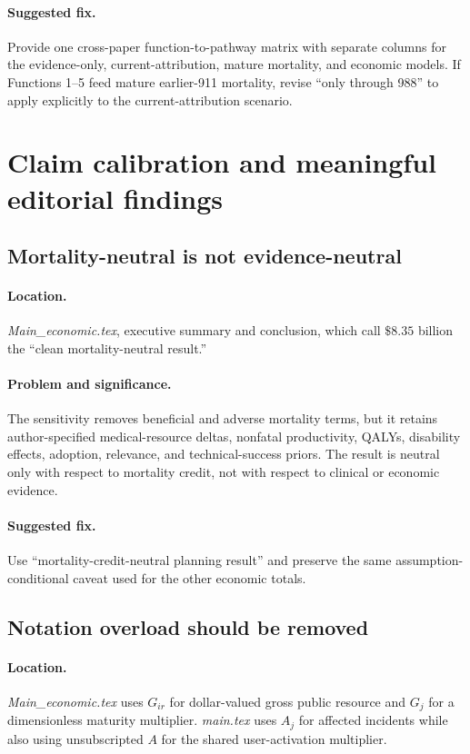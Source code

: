 \documentclass[11pt]{article}
\begin{document}
\paragraph{Suggested fix.}
Provide one cross-paper function-to-pathway matrix with separate columns for
the evidence-only, current-attribution, mature mortality, and economic models.
If Functions 1--5 feed mature earlier-911 mortality, revise ``only through
988'' to apply explicitly to the current-attribution scenario.

\section*{Claim calibration and meaningful editorial findings}

\subsection*{Mortality-neutral is not evidence-neutral}

\paragraph{Location.}
\emph{Main\_economic.tex}, executive summary and conclusion, which call
\(\$8.35\) billion the ``clean mortality-neutral result.''

\paragraph{Problem and significance.}
The sensitivity removes beneficial and adverse mortality terms, but it retains
author-specified medical-resource deltas, nonfatal productivity, QALYs,
disability effects, adoption, relevance, and technical-success priors.  The
result is neutral only with respect to mortality credit, not with respect to
clinical or economic evidence.

\paragraph{Suggested fix.}
Use ``mortality-credit-neutral planning result'' and preserve the same
assumption-conditional caveat used for the other economic totals.

\subsection*{Notation overload should be removed}

\paragraph{Location.}
\emph{Main\_economic.tex} uses \(G_{ir}\) for dollar-valued gross public
resource and \(G_j\) for a dimensionless maturity multiplier.
\emph{main.tex} uses \(A_j\) for affected incidents while also using
unsubscripted \(A\) for the shared user-activation multiplier.
\end{document}

